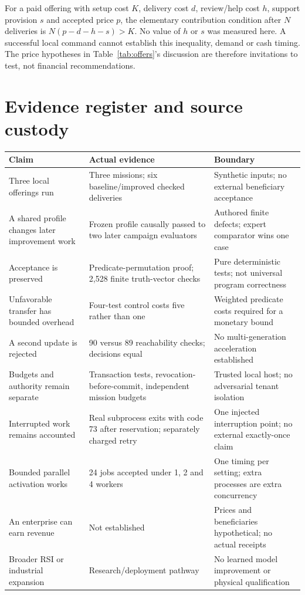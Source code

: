\documentclass[11pt,letterpaper]{article}
\begin{document}
For a paid offering with setup cost $K$, delivery cost $d$, review/help cost $h$, support provision $s$ and accepted price $p$, the elementary contribution condition after $N$ deliveries is $N(p-d-h-s)>K$. No value of $h$ or $s$ was measured here. A successful local command cannot establish this inequality, demand or cash timing. The price hypotheses in Table~\ref{tab:offers}'s discussion are therefore invitations to test, not financial recommendations.

\section{Evidence register and source custody}
\begin{longtable}{@{}P{3.1cm}P{5.3cm}P{6cm}@{}}\toprule
Claim & Actual evidence & Boundary\\\midrule\endhead
Three local offerings run & Three missions; six baseline/improved checked deliveries & Synthetic inputs; no external beneficiary acceptance\\
A shared profile changes later improvement work & Frozen profile causally passed to two later campaign evaluators & Authored finite defects; expert comparator wins one case\\
Acceptance is preserved & Predicate-permutation proof; 2,528 finite truth-vector checks & Pure deterministic tests; not universal program correctness\\
Unfavorable transfer has bounded overhead & Four-test control costs five rather than one & Weighted predicate costs required for a monetary bound\\
A second update is rejected & 90 versus 89 reachability checks; decisions equal & No multi-generation acceleration established\\
Budgets and authority remain separate & Transaction tests, revocation-before-commit, independent mission budgets & Trusted local host; no adversarial tenant isolation\\
Interrupted work remains accounted & Real subprocess exits with code 73 after reservation; separately charged retry & One injected interruption point; no external exactly-once claim\\
Bounded parallel activation works & 24 jobs accepted under 1, 2 and 4 workers & One timing per setting; extra processes are extra concurrency\\
An enterprise can earn revenue & Not established & Prices and beneficiaries hypothetical; no actual receipts\\
Broader RSI or industrial expansion & Research/deployment pathway & No learned model improvement or physical qualification\\\bottomrule
\end{longtable}
\end{document}
